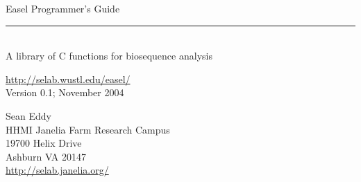 \begin{titlepage}
{\Large

\vspace*{\fill}

\noindent
{\Huge{Easel Programmer's Guide}} \\ 
\rule[2pt]{\textwidth}{1pt} \\
\hspace*{\fill} {\large {A library of C functions for
    biosequence analysis} \\ }

\vspace*{\fill}

\begin{center}
\url{http://selab.wustl.edu/easel/}\\
Version 0.1; November 2004 \\ 

\vspace*{\fill}

Sean Eddy\\
HHMI Janelia Farm Research Campus\\
19700 Helix Drive\\
Ashburn VA 20147\\
\url{http://selab.janelia.org/}\\
\end{center}

\vspace*{\fill}
}
\end{titlepage}
